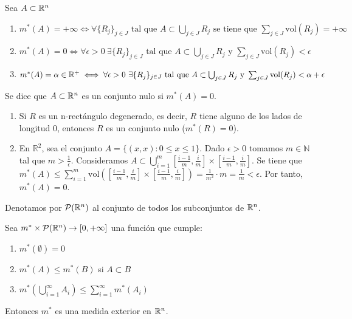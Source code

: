 \begin{observación}
    Sea $A \subset \mathbb{R}^n$ 
    \begin{enumerate}
        \item $m^*(A) = +\infty \iff \forall \{R_j\}_{j \in J} \text{ tal que } A \subset \bigcup_{j \in J} R_j \text{ se tiene que } \sum_{j \in J} \text{vol}(R_j) = +\infty$
        \item $m^*(A) = 0 \iff \forall \epsilon > 0 \ \exists \{R_j\}_{j \in J} \text{ tal que } A \subset \bigcup_{j \in J} R_j \text{ y } \sum_{j \in J} \text{vol}(R_j) < \epsilon$
        \item $m^*(A) = \alpha \in \mathbb{R}^+ \iff \forall \epsilon > 0 \ \exists \{R_j\}_{j \in J} \text{ tal que } A \subset \bigcup_{j \in J} R_j \text{ y } \sum_{j \in J} \text{vol}(R_j) < \alpha + \epsilon$    
    \end{enumerate}
\end{observación}

\begin{definición} \label{Conjunto nulo}
    Se dice que $A \subset \mathbb{R}^n$ es un conjunto nulo si $m^*(A) = 0$.
\end{definición}

\begin{enumerate}
    \item Si $R$ es un n-rectángulo degenerado, es decir, $R$ tiene alguno de los lados de longitud 0, entonces $R$ es un conjunto nulo ($m^*(R) = 0$).
    \item En $\mathbb{R}^2$, sea el conjunto $A = \{(x,x) : 0 \leq x \leq 1\}$. Dado $\epsilon > 0$ tomamos $m \in \mathbb{N}$ tal que $m > \frac{1}{\epsilon}$. Consideramos $A \subset \bigcup_{i=1}^m [\frac{i-1}{m}, \frac{i}{m}] \times [\frac{i-1}{m}, \frac{i}{m}]$. Se tiene que $m^*(A) \leq \sum_{i=1}^m \text{vol}([\frac{i-1}{m}, \frac{i}{m}] \times [\frac{i-1}{m}, \frac{i}{m}]) = \frac{1}{m^2} \cdot m = \frac{1}{m} < \epsilon$. Por tanto, $m^*(A) = 0$.
\end{enumerate}

Denotamos por $\mathcal{P}(\mathbb{R}^n)$ al conjunto de todos los subconjuntos de $\mathbb{R}^n$.
\begin{teorema}
    Sea $m^* \times \mathcal{P}(\mathbb{R}^n) \to [0, +\infty]$ una función que cumple:
    \begin{enumerate}
        \item $m^*(\emptyset) = 0$
        \item $m^*(A) \leq m^*(B)$ si $A \subset B$
        \item $m^*(\bigcup_{i=1}^\infty A_i) \leq \sum_{i=1}^\infty m^*(A_i)$
    \end{enumerate}
    Entonces $m^*$ es una medida exterior en $\mathbb{R}^n$.
\end{teorema}

